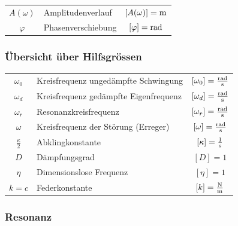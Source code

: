 \begin{tabular}{c l c}
$A(\omega)$ & Amplitudenverlauf & $[A(\omega)] = \mathrm{m}$ \\
$\varphi$ & Phasenverschiebung & $[\varphi] = \mathrm{rad}$
\end{tabular}



\subsubsection{Übersicht über Hilfsgrössen}


\begin{tabular}{c l c}
\rule{0pt}{10pt} $\omega_0$ & Kreisfrequenz ungedämpfte Schwingung & $[\omega_0] = \frac{\mathrm{rad}}{\mathrm{s}}$ \\
\rule{0pt}{10pt} $\omega_d$ & Kreisfrequenz gedämpfte Eigenfrequenz & $[\omega_d] = \frac{\mathrm{rad}}{\mathrm{s}}$ \\
\rule{0pt}{10pt} $\omega_r$ & Resonanzkreisfrequenz & $[\omega_r] = \frac{\mathrm{rad}}{\mathrm{s}}$ \\
\rule{0pt}{10pt} $\omega$ & Kreisfrequenz der Störung (Erreger) & $[\omega] = \frac{\mathrm{rad}}{\mathrm{s}}$ \\
\rule{0pt}{10pt} $\frac{\kappa}{2}$ & Abklingkonstante & $[\kappa] = \frac{1}{\mathrm{s}}$ \\
\rule{0pt}{10pt} $D$ & Dämpfungsgrad & $[D] = 1$ \\
$\eta$ & Dimensionslose Frequenz & $[\eta] = 1$  \\
$k = c$ & Federkonstante & $[k] = \frac{\mathrm{N}}{\mathrm{m}}$
\end{tabular}




\subsubsection{Resonanz}

